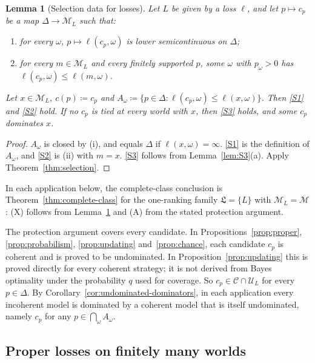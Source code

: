 \documentclass[11pt]{article}
\newtheorem{lemma}[theorem]{Lemma}
\theoremstyle{definition}
\theoremstyle{remark}
\newcommand{\M}{\mathcal M}
\newcommand{\C}{\mathcal C}
\newcommand{\U}{\mathcal U}
\newcommand{\Lf}{\mathfrak L}
\begin{document}
\begin{lemma}[Selection data for losses]\label{lem:loss-one-stage}
Let $L$ be given by a loss $\ell$, and let $p\mapsto c_p$ be a map $\Delta\to\M_L$ such that:
\begin{enumerate}[label=(\roman*)]
\item for every $\omega$, $p\mapsto\ell(c_p,\omega)$ is lower semicontinuous on $\Delta$;
\item for every $m\in\M_L$ and every finitely supported $p$, some $\omega$ with $p_\omega>0$ has $\ell(c_p,\omega)\le\ell(m,\omega)$.
\end{enumerate}
Let $x\in\M_L$, $c(p)\coloneqq c_p$ and $A_\omega\coloneqq\{p\in\Delta:\ell(c_p,\omega)\le\ell(x,\omega)\}$. Then \ref{S1} and \ref{S2} hold. If no $c_p$ is tied at every world with $x$, then \ref{S3} holds, and some $c_p$ dominates $x$.
\end{lemma}
\begin{proof}
$A_\omega$ is closed by (i), and equals $\Delta$ if $\ell(x,\omega)=\infty$. \ref{S1} is the definition of $A_\omega$, and \ref{S2} is (ii) with $m=x$. \ref{S3} follows from Lemma~\ref{lem:S3}(a). Apply Theorem~\ref{thm:selection}.
\end{proof}

In each application below, the complete-class conclusion is Theorem~\ref{thm:complete-class} for the one-ranking family $\Lf=\{L\}$ with $\M_L=\M$: (X) follows from Lemma~\ref{lem:loss-one-stage} and (A) from the stated protection argument.

The protection argument covers every candidate. In Propositions~\ref{prop:proper}, \ref{prop:probabilism}, \ref{prop:updating} and~\ref{prop:chance}, each candidate $c_p$ is coherent and is proved to be undominated. In Proposition~\ref{prop:updating} this is proved directly for every coherent strategy; it is not derived from Bayes optimality under the probability $q$ used for coverage. So $c_p\in\C\cap\U_L$ for every $p\in\Delta$. By Corollary~\ref{cor:undominated-dominators}, in each application every incoherent model is dominated by a coherent model that is itself undominated, namely $c_p$ for any $p\in\bigcap_\omega A_\omega$.

\subsection{Proper losses on finitely many worlds}
\end{document}
